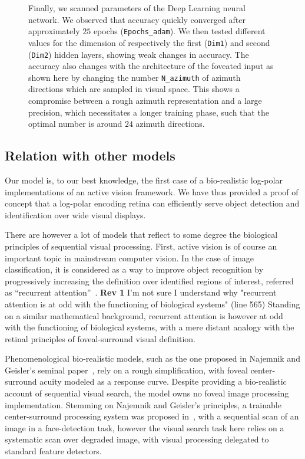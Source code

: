 \begin{figure}[t!]
{\B Finally, we scanned parameters of the Deep Learning neural network. We observed that accuracy quickly converged after approximately $25$ epochs (\texttt{Epochs\_adam}). We then tested different values for the dimension of respectively the first (\texttt{Dim1}) and second (\texttt{Dim2}) hidden layers, showing weak changes in accuracy. %
\C
The accuracy also changes with the architecture of the foveated input as shown here by changing the number \texttt{N\_azimuth} of azimuth directions which are sampled in visual space. This shows a compromise between a rough azimuth representation and a large precision, which necessitates a longer training phase, such that the optimal number is around $24$ azimuth directions. %
\label{fig:params}}%
\end{figure}%


\subsection{Relation with other models}

{\color{magenta} Our model is, to our best knowledge, the first case of a bio-realistic log-polar implementations of an active vision framework.} We have thus provided a proof of concept that a log-polar encoding retina can efficiently serve object detection and identification over wide visual displays.

There are however a lot of models that reflect to some degree the biological principles of sequential visual processing.
First, active vision is of course an important topic in mainstream computer vision. In the case of image classification, it is considered as a way to improve object recognition by progressively increasing the definition over identified regions of interest, referred as ``recurrent attention''~\cite{mnih2014recurrent,fu2017look}.
{\color{magenta} \textbf{Rev 1} I'm not sure I understand why "recurrent attention is at odd with the functioning of biological systems" (line 565)}
Standing on a similar mathematical background, recurrent attention is however at odd with the functioning of biological systems, with a mere distant analogy with the retinal principles of foveal-surround visual definition.

Phenomenological bio-realistic models, such as the one proposed in Najemnik and Geisler's seminal paper~\cite{Najemnik05}, rely on a rough simplification, with foveal center-surround acuity modeled as a response curve. Despite providing a bio-realistic account of sequential visual search, the model owns no foveal image processing implementation. Stemming on Najemnik and Geisler's principles, a trainable center-surround processing system was proposed in~\cite{Butko2010infomax}, with a sequential scan of an image in a face-detection task, however the visual search task here relies  on a systematic scan over degraded image, with visual processing delegated to standard feature detectors.

